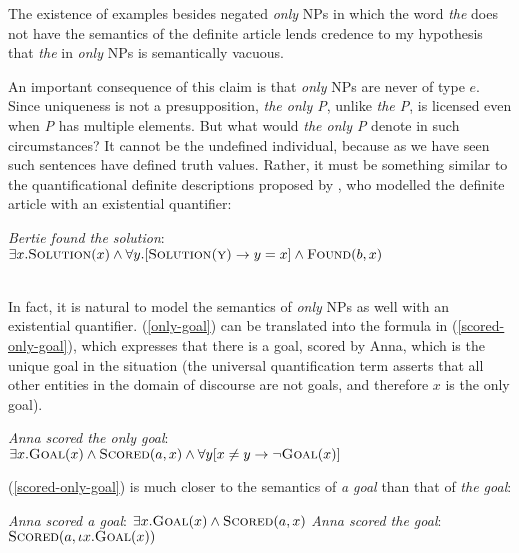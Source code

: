 The existence of examples besides negated \textit{only} NPs in which the word \textit{the} does not have the semantics of the definite article lends credence to my hypothesis that \textit{the} in \textit{only} NPs is semantically vacuous.

An important consequence of this claim is that \textit{only} NPs are never of type $e$. Since uniqueness is not a presupposition, \textit{the only P}, unlike \textit{the P}, is licensed even when \textit{P} has multiple elements. But what would \textit{the only P} denote in such circumstances? It cannot be the undefined individual, because as we have seen such sentences have defined truth values. Rather, it must be something similar to the quantificational definite descriptions proposed by \citet{russell}, who modelled the definite article with an existential quantifier:

\begin{exe}
	\ex \textit{Bertie found the solution}: \\
	$\exists x . \textsc{Solution}(x) \land \forall y . [\textsc{Solution(y)} \to y = x] \land \textsc{Found}(b, x)$ \\ \\
	\hspace*{\fill} \citep[ex. 1$'$]{horn-abbott-2012}  %
\end{exe}

In fact, it is natural to model the semantics of \textit{only} NPs as well with an existential quantifier. (\ref{only-goal}) can be translated into the formula in (\ref{scored-only-goal}), which expresses that there is a goal, scored by Anna, which is the unique goal in the situation (the universal quantification term asserts that all other entities in the domain of discourse are not goals, and therefore $x$ is the only goal).

\begin{exe}
	\ex \label{scored-only-goal} \textit{Anna scored the only goal}: \\ $\exists x . \textsc{Goal}(x) \land \textsc{Scored}(a, x) \land \forall y [ x \ne y \to \neg \textsc{Goal}(x) ] $
\end{exe}

(\ref{scored-only-goal}) is much closer to the semantics of \textit{a goal} than that of \textit{the goal}:

\begin{exe}
	\ex \label{a-goal} \textit{Anna scored a goal}: $\exists x . \textsc{Goal}(x) \land \textsc{Scored}(a, x)$
	\ex \label{the-goal} \textit{Anna scored the goal}: $\textsc{Scored}(a, \iota x . \textsc{Goal}(x))$
\end{exe}

